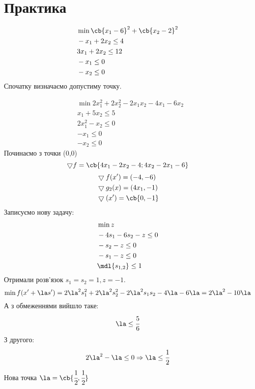 \section{Практика} 
\begin{tsk}
\begin{eqnarray}
	&\min \cb{x_1-6}^2 + \cb{x_2-2}^2\\
	&-x_1 +2x_2 \leq 4\\
	&3x_1+2x_2 \leq 12\\
	&-x_1 \leq 0\\
	&-x_2 \leq 0
\end{eqnarray}
Спочатку визначаємо допустиму точку.
\end{tsk}
\begin{tsk}
\begin{eqnarray}
	&\min 2x_1^2 + 2x^2_2 - 2x_1x_2 - 4x_1 - 6x_2 \\
	&x_1 + 5 x_2 \leq 5\\
	&2x_1^2 -x_2 \leq 0\\
	&-x_1 \leq 0\\
	&-x_2 \leq 0
\end{eqnarray}
Починаємо з точки (0,0)
\begin{equation}
	\bigtriangledown f = \cb{4x_1 - 2x_2 -4; 4x_2 - 2x_1 -6}
\end{equation}
\begin{eqnarray}
	&\bigtriangledown f(x') = (-4,-6)\\
	&\bigtriangledown g_2(x) = (4x_1,-1)\\
	&\bigtriangledown (x') = \cb{0,-1}
\end{eqnarray}
Записуємо нову задачу:
\begin{eqnarray}
	&\min z\\
	&-4s_1 - 6s_2 - z \leq 0\\
	&-s_2 - z \leq 0 \\
	&-s_1 - z \leq 0 \\
	&\mdl{s_{1,2}} \leq 1
\end{eqnarray}
Отримали розв’язок $s_1=s_2 = 1,z=-1$.\\
\begin{equation}
	\min f(x'+\la s') = 2\la^2 s_1^2 +2\la^2 s_2^2 - 2\la^2 s_1s_2 -4\la -6\la = 2\la^2 -10\la
\end{equation}
А з обмеженнями вийшло таке:
\begin{equation}
	\la\leq \cfrac56
\end{equation}
З другого:
\begin{equation}
	2\la^2 - \la\leq 0 \Rightarrow \la\leq\cfrac12 
\end{equation}
Нова точка $\la = \cb{\cfrac12,\cfrac12}$
\end{tsk}
